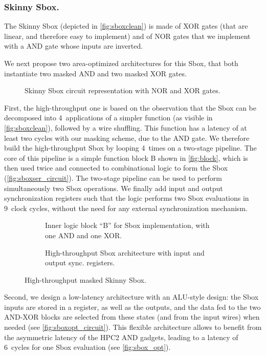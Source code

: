 \documentclass{llncs}
\begin{document}
\subsubsection{Skinny Sbox.}\label{subsub:skinny_sbox}
The Skinny Sbox (depicted in \autoref{fig:sboxclean}) is made of XOR gates (that are
linear, and therefore easy to implement) and of NOR gates that we implement
with a AND gate whose inputs are inverted.

We next propose two area-optimized architectures for this Sbox, that both
instantiate two masked AND and two masked XOR gates.
\begin{figure}
    \centering
    
    \caption{Skinny Sbox circuit representation with NOR and XOR gates.}
    \label{fig:sboxclean}
\end{figure}
First, the high-throughput one is based on the observation that the Sbox can be
decomposed into 4~applications of a simpler function (as visible in
\autoref{fig:sboxclean}), followed by a wire shuffling.
This function has a latency of at least two cycles with our masking
scheme, due to the AND gate.
We therefore build the high-throughput Sbox by looping 4~times on a two-stage
pipeline.
The core of this pipeline is a simple function block B shown in
\autoref{fig:block}, which is then used twice and connected to combinational
logic to form the Sbox (\autoref{fig:sboxser_circuit}).
The two-stage pipeline can be used to perform simultaneously two Sbox
operations.
We finally add input and output synchronization registers such that the logic
performs two Sbox evaluations in 9~clock cycles, without the need for any
external synchronization mechanism.
\begin{figure}
	\begin{subfigure}[b]{.48\textwidth}
		\centering
		
		\caption{%
                    Inner logic block ``B'' for Sbox implementation, with one
                    AND and one XOR.
                }
                \label{fig:block}
	\end{subfigure}
        \hfill
	\begin{subfigure}[b]{.48\textwidth}
		\centering
		
		\caption{%
                    High-throughput Sbox architecture with input and output
                    sync. registers.
                }
                \label{fig:sboxser_circuit}
	\end{subfigure}
	\caption{%
            High-throughput masked Skinny Sbox.
        }
        \label{fig:sboxintro}
\end{figure}
Second, we design a low-latency architecture with an ALU-style design: the Sbox
inputs are stored in a register, as well as the outputs, and the data fed to
the two AND-XOR blocks are selected from these states (and from the input
wires) when needed (see \autoref{fig:sboxopt_circuit}).
This flexible architecture allows to benefit from the asymmetric latency of the
HPC2 AND gadgets, leading to a latency of 6~cycles for one Sbox evaluation (see
\autoref{fig:sbox_opt}).
\end{document}
